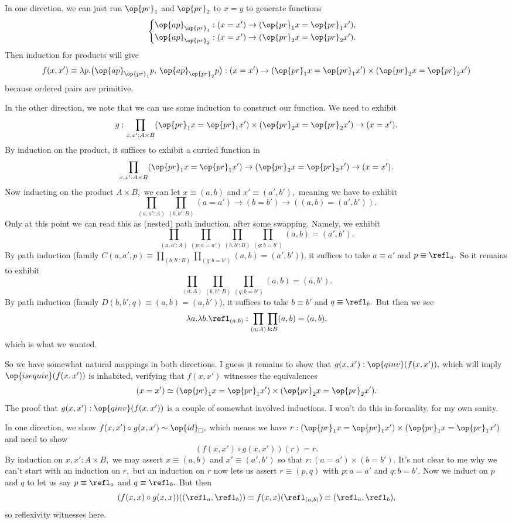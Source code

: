In one direction, we can just run $\op{pr}_1$ and $\op{pr}_2$ to $x=y$ to generate functions
\[\begin{cases}
    \op{ap}_{\op{pr}_1}:(x=x')\to(\op{pr}_1x=\op{pr}_1x'), \\
    \op{ap}_{\op{pr}_2}:(x=x')\to(\op{pr}_2x=\op{pr}_2x').
\end{cases}\]
Then induction for products will give 
\[f(x,x')\equiv\lambda p.\big(\op{ap}_{\op{pr}_1}p,\,\op{ap}_{\op{pr}_2}p\big):(x=x')\to(\op{pr}_1x=\op{pr}_1x')\times(\op{pr}_2x=\op{pr}_2x')\]
because ordered pairs are primitive.

In the other direction, we note that we can use some induction to construct our function. We need to exhibit
\[g:\prod_{x,x':A\times B}(\op{pr}_1x=\op{pr}_1x')\times(\op{pr}_2x=\op{pr}_2x')\to(x=x').\]
By induction on the product, it suffices to exhibit a curried function in
\[\prod_{x,x':A\times B}(\op{pr}_1x=\op{pr}_1x')\to(\op{pr}_2x=\op{pr}_2x')\to(x=x').\]
Now inducting on the product $A\times B,$ we can let $x\equiv(a,b)$ and $x'\equiv(a',b'),$ meaning we have to exhibit
\[\prod_{(a,a':A)}\prod_{(b,b':B)}(a=a')\to(b=b')\to((a,b)=(a',b')).\]
Only at this point we can read this as (nested) path induction, after some swapping. Namely, we exhibit
\[\prod_{(a,a':A)}\prod_{(p:a=a')}\prod_{(b,b':B)}\prod_{(q:b=b')}(a,b)=(a',b').\]
By path induction (family $C(a,a',p)\equiv\prod_{(b,b':B)}\prod_{(q:b=b')}(a,b)=(a',b')$), it suffices to take $a\equiv a'$ and $p\equiv\refl_a.$ So it remains to exhibit
\[\prod_{(a:A)}\prod_{(b,b':B)}\prod_{(q:b=b')}(a,b)=(a,b').\]
By path induction (family $D(b,b',q)\equiv(a,b)=(a,b')$), it suffices to take $b\equiv b'$ and $q\equiv\refl_b.$ But then we see
\[\lambda a.\lambda b.\refl_{(a,b)}:\prod_{(a:A)}\prod_{b:B}(a,b)=(a,b),\]
which is what we wanted.

So we have somewhat natural mappings in both directions. I guess it remains to show that $g(x,x'):\op{qinv}(f(x,x')),$ which will imply $\op{isequiv}(f(x,x'))$ is inhabited, verifying that $f(x,x')$ witnesses the equivalences
\[(x=x')\simeq(\op{pr}_1x=\op{pr}_1x')\times(\op{pr}_2x=\op{pr}_2x').\]
The proof that $g(x,x'):\op{qinv}(f(x,x'))$ is a couple of somewhat involved inductions. I won't do this in formality, for my own sanity.

In one direction, we show $f(x,x')\circ g(x,x')\sim\op{id}_\square,$ which means we have $r:(\op{pr}_1x=\op{pr}_1x')\times(\op{pr}_1x=\op{pr}_1x')$ and need to show
\[(f(x,x')\circ g(x,x'))(r)=r.\]
By induction on $x,x':A\times B,$ we may assert $x\equiv(a,b)$ and $x'\equiv(a',b')$ so that $r:(a=a')\times(b=b').$ It's not clear to me why we can't start with an induction on $r,$ but an induction on $r$ now lets us assert $r\equiv(p,q)$ with $p:a=a'$ and $q:b=b'.$ Now we induct on $p$ and $q$ to let us say $p\equiv\refl_a$ and $q\equiv\refl_b.$ But then
\[(f(x,x)\circ g(x,x))((\refl_a,\refl_b))\equiv f(x,x)(\refl_{(a,b)})\equiv(\refl_a,\refl_b),\]
so reflexivity witnesses here.

